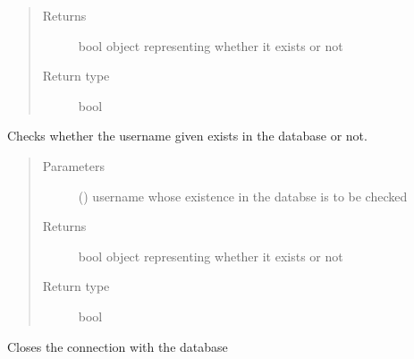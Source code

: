 \documentclass[letterpaper,10pt,english]{sphinxmanual}
\begin{document}
\begin{fulllineitems}
\begin{fulllineitems}
\begin{quote}
\begin{description}
\item[{Returns}] \leavevmode
bool object representing whether it exists or not

\item[{Return type}] \leavevmode
bool

\end{description}\end{quote}

\end{fulllineitems}


\begin{fulllineitems}
\label{\detokenize{sql:sql.Database.check_username}}
Checks whether the username given exists in the database or not.
\begin{quote}\begin{description}
\item[{Parameters}] \leavevmode
{} () \textendash{} username whose existence in the databse is to be checked

\item[{Returns}] \leavevmode
bool object representing whether it exists or not

\item[{Return type}] \leavevmode
bool

\end{description}\end{quote}

\end{fulllineitems}


\begin{fulllineitems}
\label{\detokenize{sql:sql.Database.close_connection}}
Closes the connection with the database

\end{fulllineitems}



\end{fulllineitems}
\end{document}

